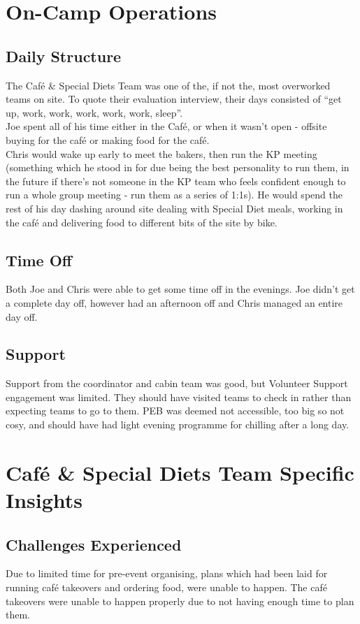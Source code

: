 \section{On-Camp Operations}
\subsection{Daily Structure}
The Café \& Special Diets Team was one of the, if not the, most overworked teams on site. To quote their evaluation interview, their days consisted of ``get up, work, work, work, work, work, sleep''.\\

Joe spent all of his time either in the Café, or when it wasn't open - offsite buying for the café or making food for the café.\\

Chris would wake up early to meet the bakers, then run the KP meeting (something which he stood in for due being the best personality to run them, in the future if there's not someone in the KP team who feels confident enough to run a whole group meeting - run them as a series of 1:1s). He would spend the rest of his day dashing around site dealing with Special Diet meals, working in the café and delivering food to different bits of the site by bike.
\subsection{Time Off}
Both Joe and Chris were able to get some time off in the evenings. Joe didn't get a complete day off, however had an afternoon off and Chris managed an entire day off. 
\subsection{Support}
Support from the coordinator and cabin team was good, but Volunteer Support engagement was limited. They should have visited teams to check in rather than expecting teams to go to them. PEB was deemed not accessible, too big so not cosy, and should have had light evening programme for chilling after a long day.

\section{Café \& Special Diets Team Specific Insights}
\subsection{Challenges Experienced}
Due to limited time for pre-event organising, plans which had been laid for running café takeovers and ordering food, were unable to happen. The café takeovers were unable to happen properly due to not having enough time to plan them.\\

